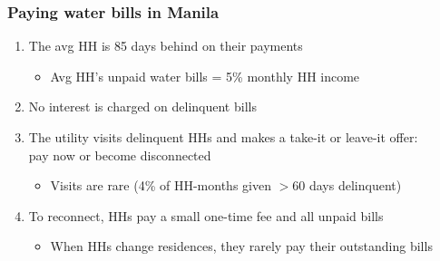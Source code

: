 \documentclass[aspectratio=149]{beamer}
\begin{document}

\begin{frame}
\frametitle{Paying water bills in Manila}

\begin{enumerate}


\item The avg HH is 85 days behind on their payments
  \begin{itemize}
    \item Avg HH's unpaid water bills = 5\% monthly HH income
  \end{itemize}
\vspace{3mm}

\item No interest is charged on delinquent bills 

\vspace{3mm}

\item The utility visits delinquent HHs and makes a take-it or leave-it offer: \\ pay now or become disconnected %
\vspace{.5mm}
  \begin{itemize}
    \item Visits are rare (4\% of HH-months given $>$60 days delinquent)
  \end{itemize}

\vspace{3mm}

\item To reconnect, HHs pay a small one-time fee and all unpaid bills
\vspace{.5mm}
  \begin{itemize}
    \item When HHs change residences, they rarely pay their outstanding bills 
  \end{itemize}

\end{enumerate}


\end{frame}
\end{document}
